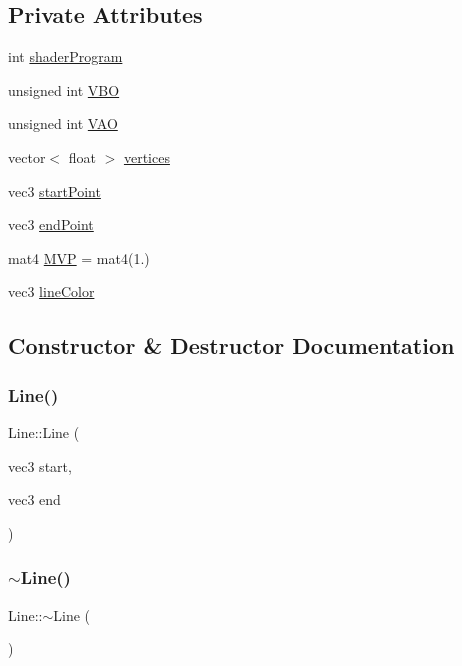 \subsection*{Private Attributes}
\begin{DoxyCompactItemize}
\item 
int \hyperlink{classLine_a878054adb2870a07cd412214302b60d5}{shader\+Program}
\item 
unsigned int \hyperlink{classLine_a24a4150cae9dbaa98d0f21c6be6c7755}{V\+BO}
\item 
unsigned int \hyperlink{classLine_aa17e21db4b9157d666a0c18c18552018}{V\+AO}
\item 
vector$<$ float $>$ \hyperlink{classLine_a161c9dfa204c9758a47b58d9902d5c2c}{vertices}
\item 
vec3 \hyperlink{classLine_a84483386d92f8d092aab79e611095134}{start\+Point}
\item 
vec3 \hyperlink{classLine_aa59cf1049e8a0781bcd410381a1a413d}{end\+Point}
\item 
mat4 \hyperlink{classLine_af3438d68650cd3d26733d4c2043b3c1f}{M\+VP} = mat4(1.)
\item 
vec3 \hyperlink{classLine_a20e21995b7bf5cf61d68e8cf94e42f3d}{line\+Color}
\end{DoxyCompactItemize}


\subsection{Constructor \& Destructor Documentation}
\mbox{\label{classLine_aae4b6f0aa93bf671632a9c932ce81164}} 
\subsubsection{\texorpdfstring{Line()}{Line()}}
{\footnotesize\ttfamily Line\+::\+Line (\begin{DoxyParamCaption}\item[{vec3}]{start,  }\item[{vec3}]{end }\end{DoxyParamCaption})\hspace{0.3cm}{\ttfamily [inline]}}

\mbox{\label{classLine_aabe85f48d22d92b62257091f48174fac}} 
\subsubsection{\texorpdfstring{$\sim$\+Line()}{~Line()}}
{\footnotesize\ttfamily Line\+::$\sim$\+Line (\begin{DoxyParamCaption}{ }\end{DoxyParamCaption})\hspace{0.3cm}{\ttfamily [inline]}}




